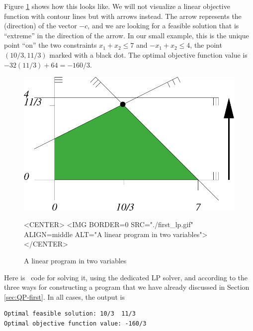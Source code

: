 Figure \ref{fig:QP-first_lp} shows how this looks like. We will not
visualize a linear objective function with contour lines but with
arrows instead. The arrow represents the (direction) of the vector $-c$,
and we are looking for a feasible solution that is ``extreme'' in the direction
of the arrow. In our small example, this is the unique point ``on'' the
two constraints $x_1+x_2\leq 7$ and $-x_1+x_2\leq 4$, the point
$(10/3,11/3)$ marked with a black dot. The optimal objective function
value is $-32(11/3)+64=-160/3$.

\begin{figure}[htbp]
\begin{ccTexOnly}
\begin{center}
\includegraphics{QP_solver/first_lp} %
\end{center}
\end{ccTexOnly}

\begin{ccHtmlOnly}
<CENTER>
<IMG BORDER=0 SRC="./first_lp.gif" ALIGN=middle ALT="A linear program in two variables">
</CENTER>
\end{ccHtmlOnly}

\caption{A linear program in two variables
\label{fig:QP-first_lp}}
\end{figure}

Here is \cgal\ code for solving it, using the dedicated LP solver, and
according to the three ways for constructing a program that we have
already discussed in Section \ref{sec:QP-first}. 
In all cases, the output is
\begin{verbatim}
Optimal feasible solution: 10/3  11/3
Optimal objective function value: -160/3
\end{verbatim}

